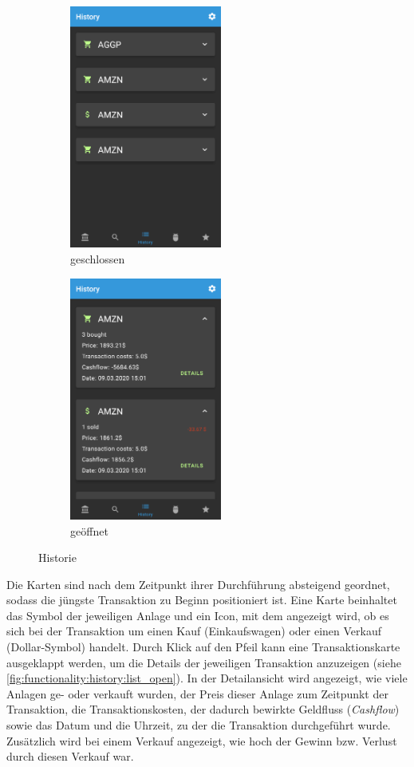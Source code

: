 \documentclass[a4paper]{article}
\begin{document}
\begin{figure}[H]
	\centering
    \begin{subfigure}{.49\textwidth}
        \centering
        \includegraphics[height=8cm,keepaspectratio]{./images/history_list.png}
        \caption{geschlossen}
        \label{fig:functionality:history:list_closed}
    \end{subfigure}
    \begin{subfigure}{.49\textwidth}
        \centering
        \includegraphics[height=8cm,keepaspectratio]{./images/history_list_open.png}
        \caption{geöffnet}
        \label{fig:functionality:history:list_open}
    \end{subfigure}
	\caption{Historie}
	\label{fig:functionality:history:list}
\end{figure}

Die Karten sind nach dem Zeitpunkt ihrer Durchführung absteigend geordnet, sodass die jüngste Transaktion zu Beginn positioniert ist.
Eine Karte beinhaltet das Symbol der jeweiligen Anlage und ein Icon, mit dem angezeigt wird, ob es sich bei der Transaktion um einen Kauf (Einkaufswagen) oder einen Verkauf (Dollar-Symbol) handelt.
Durch Klick auf den Pfeil kann eine Transaktionskarte ausgeklappt werden, um die Details der jeweiligen Transaktion anzuzeigen (siehe \autoref{fig:functionality:history:list_open}).
In der Detailansicht wird angezeigt, wie viele Anlagen ge- oder verkauft wurden, der Preis dieser Anlage zum Zeitpunkt der Transaktion, die Transaktionskosten, der dadurch bewirkte Geldfluss (\textit{Cashflow}) sowie das Datum und die Uhrzeit, zu der die Transaktion durchgeführt wurde.
Zusätzlich wird bei einem Verkauf angezeigt, wie hoch der Gewinn bzw. Verlust durch diesen Verkauf war.
\end{document}
